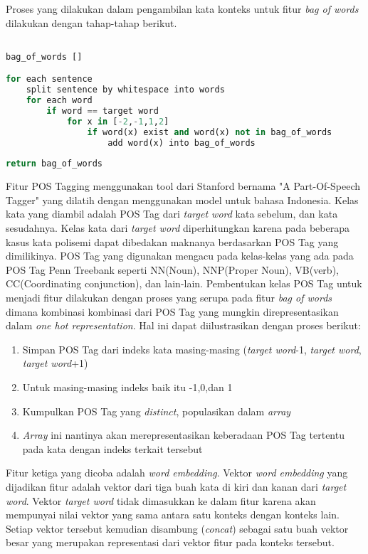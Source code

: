 Proses yang dilakukan dalam pengambilan kata konteks untuk fitur \textit{bag of words} dilakukan dengan tahap-tahap berikut.

\begin{lstlisting}[language=python,caption={Fitur Bag of Words}, label={fitur-bag-of-words}]

bag_of_words []

for each sentence
	split sentence by whitespace into words
	for each word
		if word == target word
			for x in [-2,-1,1,2]
				if word(x) exist and word(x) not in bag_of_words
					add word(x) into bag_of_words
					
return bag_of_words

\end{lstlisting}

Fitur POS Tagging menggunakan tool dari Stanford bernama "A Part-Of-Speech Tagger" yang dilatih dengan menggunakan model untuk bahasa Indonesia. Kelas kata yang diambil adalah POS Tag dari \textit{target word} kata sebelum, dan kata sesudahnya. Kelas kata dari \textit{target word} diperhitungkan karena pada beberapa kasus kata polisemi dapat dibedakan maknanya berdasarkan POS Tag yang dimilikinya. POS Tag yang digunakan mengacu pada kelas-kelas yang ada pada POS Tag Penn Treebank seperti NN(Noun), NNP(Proper Noun), VB(verb), CC(Coordinating conjunction), dan lain-lain. Pembentukan kelas POS Tag untuk menjadi fitur dilakukan dengan proses yang serupa pada fitur \textit{bag of words} dimana kombinasi kombinasi dari POS Tag yang mungkin direpresentasikan dalam \textit{one hot representation}. Hal ini dapat diilustrasikan dengan proses berikut:

\begin{enumerate}
	\item Simpan POS Tag dari indeks kata masing-masing (\textit{target word}-1, \textit{target word}, \textit{target word}+1)
	\item Untuk masing-masing indeks baik itu -1,0,dan 1
	\item Kumpulkan POS Tag yang \textit{distinct}, populasikan dalam \textit{array}
	\item \textit{Array} ini nantinya akan merepresentasikan keberadaan POS Tag tertentu pada kata dengan indeks terkait tersebut
\end{enumerate}

Fitur ketiga yang dicoba adalah \textit{word embedding}. Vektor \textit{word embedding} yang dijadikan fitur adalah vektor dari tiga buah kata di kiri dan kanan dari \textit{target word}. Vektor \textit{target word} tidak dimasukkan ke dalam fitur karena akan mempunyai nilai vektor yang sama antara satu konteks dengan konteks lain. Setiap vektor tersebut kemudian disambung (\textit{concat}) sebagai satu buah vektor besar yang merupakan representasi dari vektor fitur pada konteks tersebut. 


